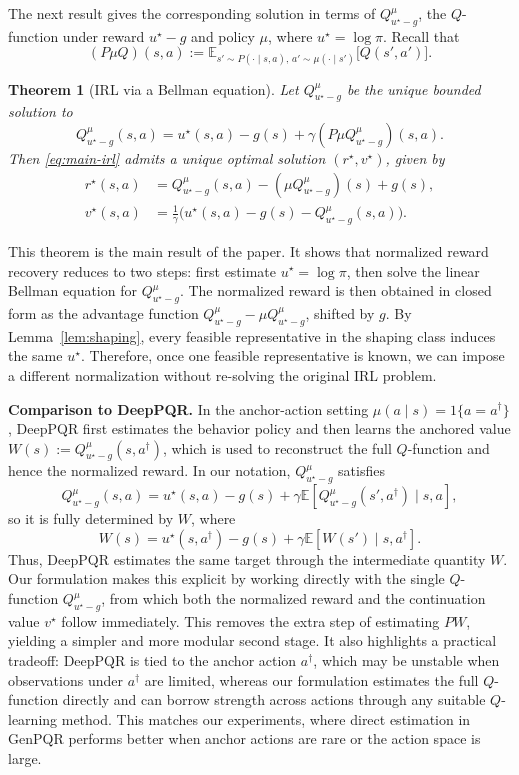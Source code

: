 \documentclass{article}
\newtheorem{theorem}{Theorem}
\newcommand{\E}{\mathbb{E}}
\newcommand{\1}{\mathbbm{1}}
\begin{document}
The next result gives the corresponding solution in terms of
\(Q^\mu_{u^\star-g}\), the \(Q\)-function under reward \(u^\star-g\) and policy
\(\mu\), where \(u^\star=\log \pi\). Recall that
\[
(P\mu Q)(s,a):=\mathbb{E}_{s' \sim P(\cdot\mid s,a),\, a' \sim \mu(\cdot\mid s')}
\bigl[Q(s',a')\bigr].
\]

\begin{theorem}[IRL via a Bellman equation]
\label{thm:unique}
Let \(Q^\mu_{u^\star-g}\) be the unique bounded solution to
\[
Q^\mu_{u^\star-g}(s,a) = u^\star(s,a)-g(s) + \gamma (P \mu Q^\mu_{u^\star-g})(s,a).
\]
Then \eqref{eq:main-irl} admits a unique optimal solution \((r^\star,v^\star)\), given by
\begin{align*}
r^\star(s,a)
    &= Q^\mu_{u^\star-g}(s,a)
    - (\mu Q^\mu_{u^\star-g})(s)
    + g(s), \\
v^\star(s,a)
    &= \frac{1}{\gamma}\bigl(
    u^\star(s,a) - g(s) - Q^\mu_{u^\star-g}(s,a)
    \bigr).
\end{align*}
\end{theorem}

 
This theorem is the main result of the paper. It shows that normalized reward
recovery reduces to two steps: first estimate \(u^\star = \log \pi\), then solve
the linear Bellman equation for \(Q^\mu_{u^\star-g}\). The normalized reward is then obtained in closed form as the advantage function
\(Q^\mu_{u^\star-g} - \mu Q^\mu_{u^\star-g}\), shifted by \(g\). By Lemma~\ref{lem:shaping}, every feasible
representative in the shaping class induces the same \(u^\star\). Therefore,
once one feasible representative is known, we can impose a different
normalization without re-solving the original IRL problem.  

 
\textbf{Comparison to DeepPQR.} In the anchor-action setting
\(\mu(a \mid s)=1\{a=a^\dagger\}\), DeepPQR \citep{geng2020deep} first
estimates the behavior policy and then learns the anchored value
\(W(s):=Q^\mu_{u^\star-g}(s,a^\dagger)\), which is used to reconstruct the full
\(Q\)-function and hence the normalized reward. In our notation,
\(Q^\mu_{u^\star-g}\) satisfies
\[
Q^\mu_{u^\star-g}(s,a)
=
u^\star(s,a)-g(s)+\gamma \E\!\left[Q^\mu_{u^\star-g}(s',a^\dagger)\mid s,a\right],
\]
so it is fully determined by \(W\), where
\[
W(s)=u^\star(s,a^\dagger)-g(s)+\gamma \E[W(s')\mid s,a^\dagger].
\]
Thus, DeepPQR estimates the same target through the intermediate quantity
\(W\). Our formulation makes this explicit by working directly with the single
\(Q\)-function \(Q^\mu_{u^\star-g}\), from which both the normalized reward and
the continuation value \(v^\star\) follow immediately. This removes the extra
step of estimating \(PW\), yielding a simpler and more modular second stage.
It also highlights a practical tradeoff: DeepPQR is tied to the anchor action
\(a^\dagger\), which may be unstable when observations under \(a^\dagger\) are
limited, whereas our formulation estimates the full \(Q\)-function directly and
can borrow strength across actions through any suitable \(Q\)-learning method.
This matches our experiments, where direct estimation in GenPQR performs
better when anchor actions are rare or the action space is large.
\end{document}

